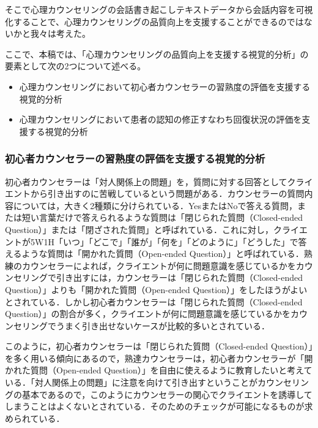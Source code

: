 \documentclass[shuuron]{kuee}
\begin{document}
そこで心理カウンセリングの会話書き起こしテキストデータから会話内容を可視化することで、心理カウンセリングの品質向上を支援することができるのではないかと我々は考えた。

ここで、本稿では、「心理カウンセリングの品質向上を支援する視覚的分析」の要素として次の2つについて述べる。
\begin{itemize}
\item 心理カウンセリングにおいて初心者カウンセラーの習熟度の評価を支援する視覚的分析
\item 心理カウンセリングにおいて患者の認知の修正すなわち回復状況の評価を支援する視覚的分析
\end{itemize}




\subsubsection{初心者カウンセラーの習熟度の評価を支援する視覚的分析}



初心者カウンセラーは「対人関係上の問題」を，質問に対する回答としてクライエントから引き出すのに苦戦しているという問題がある．カウンセラーの質問内容については，大きく2種類に分けられている．YesまたはNoで答える質問，または短い言葉だけで答えられるような質問は「閉じられた質問（Closed-ended Question）」または「閉ざされた質問」と呼ばれている．これに対し，クライエントが5W1H「いつ」「どこで」「誰が」「何を」「どのように」「どうした」で答えるような質問は「開かれた質問（Open-ended Question）」と呼ばれている．熟練のカウンセラーによれば，クライエントが何に問題意識を感じているかをカウンセリングで引き出すには，カウンセラーは「閉じられた質問（Closed-ended Question）」よりも「開かれた質問（Open-ended Question）」をしたほうがよいとされている．しかし初心者カウンセラーは「閉じられた質問（Closed-ended Question）」の割合が多く，クライエントが何に問題意識を感じているかをカウンセリングでうまく引き出せないケースが比較的多いとされている．

このように，初心者カウンセラーは「閉じられた質問（Closed-ended Question）」を多く用いる傾向にあるので，熟達カウンセラーは，初心者カウンセラーが「開かれた質問（Open-ended Question）」を自由に使えるように教育したいと考えている．「対人関係上の問題」に注意を向けて引き出すということがカウンセリングの基本であるので，このようにカウンセラーの関心でクライエントを誘導してしまうことはよくないとされている．そのためのチェックが可能になるものが求められている．
\end{document}
